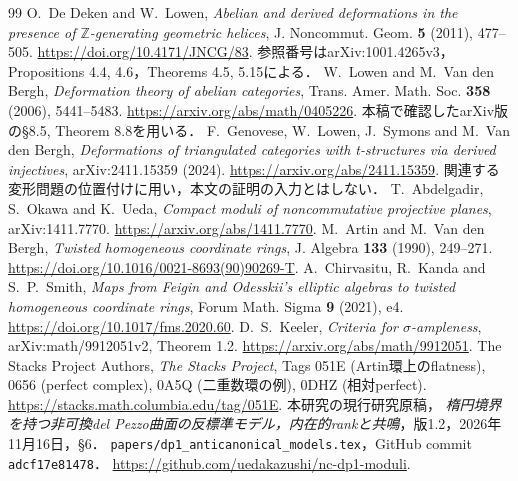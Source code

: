 \documentclass[11pt,a4paper]{ltjsarticle}
\theoremstyle{definition}
\begin{document}
\begin{thebibliography}{99}
 O.~De Deken and W.~Lowen,
\emph{Abelian and derived deformations in the presence of $\mathbb Z$-generating geometric helices},
J. Noncommut. Geom. \textbf{5} (2011), 477--505.
\url{https://doi.org/10.4171/JNCG/83}.
参照番号はarXiv:1001.4265v3，Propositions 4.4, 4.6，Theorems 4.5, 5.15による．
 W.~Lowen and M.~Van den Bergh,
\emph{Deformation theory of abelian categories},
Trans. Amer. Math. Soc. \textbf{358} (2006), 5441--5483.
\url{https://arxiv.org/abs/math/0405226}.
本稿で確認したarXiv版の\S8.5, Theorem 8.8を用いる．
 F.~Genovese, W.~Lowen, J.~Symons and M.~Van den Bergh,
\emph{Deformations of triangulated categories with t-structures via derived injectives},
arXiv:2411.15359 (2024).
\url{https://arxiv.org/abs/2411.15359}.
関連する変形問題の位置付けに用い，本文の証明の入力とはしない．
 T.~Abdelgadir, S.~Okawa and K.~Ueda,
\emph{Compact moduli of noncommutative projective planes}, arXiv:1411.7770.
\url{https://arxiv.org/abs/1411.7770}.
 M.~Artin and M.~Van den Bergh,
\emph{Twisted homogeneous coordinate rings}, J. Algebra \textbf{133} (1990), 249--271.
\url{https://doi.org/10.1016/0021-8693(90)90269-T}.
 A.~Chirvasitu, R.~Kanda and S.~P.~Smith,
\emph{Maps from Feigin and Odesskii's elliptic algebras to twisted homogeneous coordinate rings},
Forum Math. Sigma \textbf{9} (2021), e4.
\url{https://doi.org/10.1017/fms.2020.60}.
 D.~S.~Keeler, \emph{Criteria for $\sigma$-ampleness},
arXiv:math/9912051v2, Theorem 1.2.
\url{https://arxiv.org/abs/math/9912051}.
 The Stacks Project Authors, \emph{The Stacks Project},
Tags 051E (Artin環上のflatness), 0656 (perfect complex),
0A5Q (二重数環の例), 0DHZ (相対perfect).
\url{https://stacks.math.columbia.edu/tag/051E}.
 本研究の現行研究原稿，
\emph{楕円境界を持つ非可換del Pezzo曲面の反標準モデル，内在的rankと共鳴}，版1.2，2026年11月16日，\S6．
\texttt{papers/dp1\_anticanonical\_models.tex}，GitHub commit \texttt{adcf17e81478}．
\url{https://github.com/uedakazushi/nc-dp1-moduli}.
\end{thebibliography}
\end{document}
